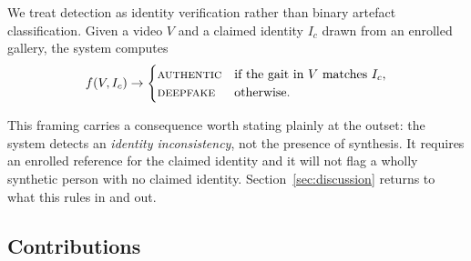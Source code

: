 \documentclass[journal]{IEEEtran}
\begin{document}
We treat detection as identity verification rather than binary artefact
classification. Given a video $V$ and a claimed identity $I_c$ drawn from an
enrolled gallery, the system computes
\begin{equation}
f(V, I_c) \rightarrow
\begin{cases}
\textsc{authentic} & \text{if the gait in } V \text{ matches } I_c,\\
\textsc{deepfake}  & \text{otherwise.}
\end{cases}
\label{eq:problem}
\end{equation}

This framing carries a consequence worth stating plainly at the outset: the
system detects an \emph{identity inconsistency}, not the presence of synthesis.
It requires an enrolled reference for the claimed identity and it will not flag
a wholly synthetic person with no claimed identity. Section~\ref{sec:discussion}
returns to what this rules in and out.

\subsection{Contributions}
\end{document}
